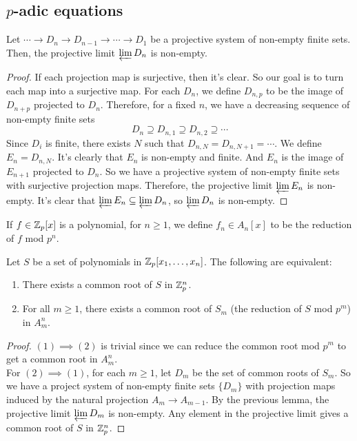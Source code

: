 \documentclass[15pt]{scrartcl}
\begin{document}
\subsection{$p$-adic equations}
\begin{lemma}
    Let $\cdots \to D_n \to D_{n-1} \to \cdots \to D_1$ be a projective system of non-empty finite sets. Then, the projective limit $\varprojlim D_n$ is non-empty.
\end{lemma}
\begin{proof}
    If each projection map is surjective, then it's clear. So our goal is to turn each map into a surjective map. For each $D_n$, we define $D_{n,p}$ to be the image of $D_{n+p}$ projected to $D_n$. Therefore, for a fixed $n$, we have a decreasing sequence of non-empty finite sets
    \[D_n\supseteq D_{n,1}\supseteq D_{n,2}\supseteq \cdots\]
    Since $D_i$ is finite, there exists $N$ such that $D_{n,N}=D_{n,N+1}=\cdots$. We define $E_n=D_{n,N}$. It's clearly that $E_n$ is non-empty and finite. And $E_n$ is the image of $E_{n+1}$ projected to $D_n$. So we have a projective system of non-empty finite sets with surjective projection maps. Therefore, the projective limit $\varprojlim E_n$ is non-empty. It's clear that $\varprojlim E_n \subseteq \varprojlim D_n$, so $\varprojlim D_n$ is non-empty.
\end{proof}
\begin{definition}
    If $f\in \mathbb Z_p[x]$ is a polynomial, for $n\geq 1$, we define $f_n\in A_n[x]$ to be the reduction of $f$ mod $p^n$.
\end{definition}
\begin{theorem}
    Let $S$ be a set of polynomials in $\mathbb Z_p[x_1,\ldots,x_n]$. The following are equivalent:
    \begin{enumerate}
        \item There exists a common root of $S$ in $\mathbb Z_p^n$. 
        \item For all $m\geq 1$, there exists a common root of $S_m$ (the reduction of $S$ mod $p^m$) in $A_m^n$.
    \end{enumerate}
\end{theorem}
\begin{proof}
    $(1)\implies (2)$ is trivial since we can reduce the common root mod $p^m$ to get a common root in $A_m^n$.
    \\
    
    For $(2)\implies (1)$, for each $m\geq 1$, let $D_m$ be the set of common roots of $S_m$. So we have a project system of non-empty finite sets $\{D_m\}$ with projection maps induced by the natural projection $A_{m}\to A_{m-1}$. By the previous lemma, the projective limit $\varprojlim D_m$ is non-empty. Any element in the projective limit gives a common root of $S$ in $\mathbb Z_p^n$.
\end{proof}
\end{document}
